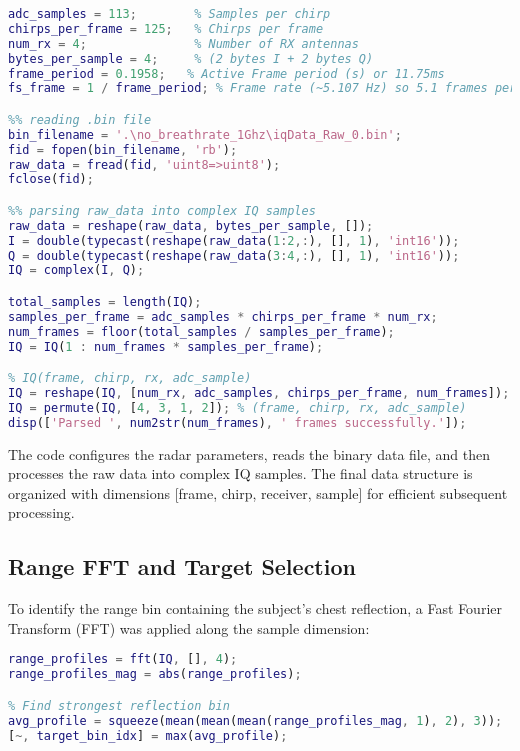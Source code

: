 \documentclass[12pt]{article}
\begin{document}
\begin{lstlisting}[language=Matlab]
%% Radar Configuration
adc_samples = 113;        % Samples per chirp
chirps_per_frame = 125;   % Chirps per frame
num_rx = 4;               % Number of RX antennas
bytes_per_sample = 4;     % (2 bytes I + 2 bytes Q)
frame_period = 0.1958;   % Active Frame period (s) or 11.75ms
fs_frame = 1 / frame_period; % Frame rate (~5.107 Hz) so 5.1 frames per seconds

%% reading .bin file
bin_filename = '.\no_breathrate_1Ghz\iqData_Raw_0.bin';
fid = fopen(bin_filename, 'rb');
raw_data = fread(fid, 'uint8=>uint8');
fclose(fid);

%% parsing raw_data into complex IQ samples
raw_data = reshape(raw_data, bytes_per_sample, []);
I = double(typecast(reshape(raw_data(1:2,:), [], 1), 'int16'));
Q = double(typecast(reshape(raw_data(3:4,:), [], 1), 'int16'));
IQ = complex(I, Q);

total_samples = length(IQ);
samples_per_frame = adc_samples * chirps_per_frame * num_rx;
num_frames = floor(total_samples / samples_per_frame);
IQ = IQ(1 : num_frames * samples_per_frame);

% IQ(frame, chirp, rx, adc_sample)
IQ = reshape(IQ, [num_rx, adc_samples, chirps_per_frame, num_frames]);
IQ = permute(IQ, [4, 3, 1, 2]); % (frame, chirp, rx, adc_sample)
disp(['Parsed ', num2str(num_frames), ' frames successfully.']);
\end{lstlisting}

The code configures the radar parameters, reads the binary data file, and then processes the raw data into complex IQ samples. The final data structure is organized with dimensions [frame, chirp, receiver, sample] for efficient subsequent processing.

\subsection{Range FFT and Target Selection}
To identify the range bin containing the subject's chest reflection, a Fast Fourier Transform (FFT) was applied along the sample dimension:

\begin{lstlisting}[language=Matlab]
% Range FFT
range_profiles = fft(IQ, [], 4);
range_profiles_mag = abs(range_profiles);

% Find strongest reflection bin
avg_profile = squeeze(mean(mean(mean(range_profiles_mag, 1), 2), 3));
[~, target_bin_idx] = max(avg_profile);
\end{lstlisting}
\end{document}

